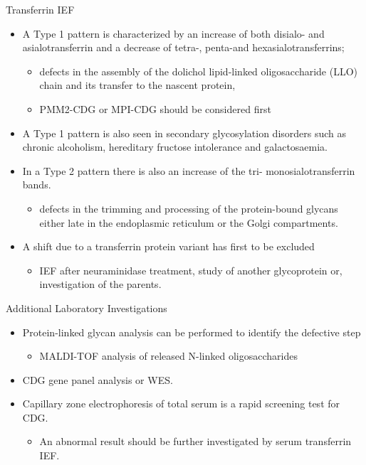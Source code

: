 \documentclass[presentation, smaller]{beamer}
\begin{document}
\begin{frame}[label={sec:orgd1a0830}]{Transferrin IEF}
\begin{itemize}
\item A Type 1 pattern is characterized by an increase of both disialo- and
asialotransferrin and a decrease of tetra-, penta-and
hexasialotransferrins;

\begin{itemize}
\item defects in the assembly of the dolichol lipid-linked oligosaccharide (LLO) chain
and its transfer to the nascent protein,
\item PMM2-CDG or MPI-CDG should be considered first
\end{itemize}

\item A Type 1 pattern is also seen in secondary glycosylation disorders
such as chronic alcoholism, hereditary fructose intolerance and
galactosaemia.

\item In a Type 2 pattern there is also an increase of the tri- \textpm{}
monosialotransferrin bands.

\begin{itemize}
\item defects in the trimming and processing of the protein-bound
glycans either late in the endoplasmic reticulum or the Golgi
compartments.
\end{itemize}

\item A shift due to a transferrin protein variant has first to be excluded
\begin{itemize}
\item IEF after neuraminidase treatment, study of another glycoprotein
or, investigation of the parents.
\end{itemize}
\end{itemize}
\end{frame}

\begin{frame}[label={sec:orgd7f12a3}]{Additional Laboratory Investigations}
\begin{itemize}
\item Protein-linked glycan analysis can be performed to identify the defective step
\begin{itemize}
\item MALDI-TOF analysis of released N-linked oligosaccharides
\end{itemize}
\item CDG gene panel analysis or WES.

\item Capillary zone electrophoresis of total serum is a rapid screening
test for CDG.
\begin{itemize}
\item An abnormal result should be further investigated by serum
transferrin IEF.
\end{itemize}
\end{itemize}
\end{frame}
\end{document}
